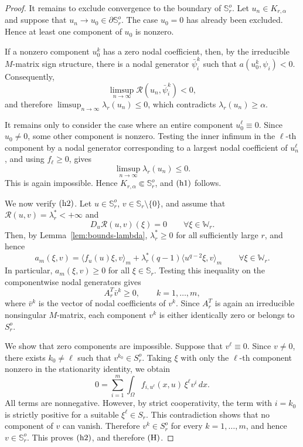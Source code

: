 \documentclass[preprint,10pt]{elsarticle}
\numberwithin{equation}{section}
\begin{document}
\begin{proof}
	It remains to exclude convergence to the boundary of \(\mathbb S_r^o\).
	Let \(u_n\in K_{r,\alpha}\) and suppose that
	\(u_n\to u_0\in\partial\mathbb S_r^o\). The case \(u_0=0\) has already
	been excluded. Hence at least one component of \(u_0\) is nonzero.
	
	If a nonzero component \(u_0^k\) has a zero nodal coefficient, then, by the
	irreducible \(M\)-matrix sign structure, there is a nodal generator
	\(\bar\psi_i^k\) such that \(a(u_0^k,\psi_i)<0\). Consequently,
	\[
	\limsup_{n\to\infty}
	\mathcal R(u_n,\bar\psi_i^k)<0,
	\]
	and therefore \(\limsup_{n\to\infty}\lambda_r(u_n)\le0\), which contradicts
	\(\lambda_r(u_n)\ge\alpha\).
	
	It remains only to consider the case where an entire component
	\(u_0^\ell\equiv0\). Since \(u_0\ne0\), some other component is nonzero.
	Testing the inner infimum in the \(\ell\)-th component by a nodal generator
	corresponding to a largest nodal coefficient of \(u_n^\ell\), and using
	\(f_\ell\ge0\), gives
	\[
	\limsup_{n\to\infty}\lambda_r(u_n)\le0.
	\]
	This is again impossible. Hence \(K_{r,\alpha}\Subset\mathbb S_r^o\), and
	\({\rm (h1)}\) follows.
	
	We now verify \({\rm (h2)}\). Let
	\(u\in\mathbb S_r^o\), \(v\in\mathbb S_r\setminus\{0\}\), and assume that
	\(\mathcal R(u,v)=\lambda_r^*<+\infty\) and
	\[
	D_u\mathcal R(u,v)(\xi)=0
	\qquad \forall \xi\in\mathbb W_r .
	\]
	Then, by Lemma~\ref{lem:bounds-lambda}, \(\lambda_r^*\ge0\) for all
	sufficiently large \(r\), and hence
	\[
	a_m(\xi,v)
	=
	\langle f_u(u)\xi,v\rangle_m
	+
	\lambda_r^*(q-1)\langle u^{q-2}\xi,v\rangle_m
	\qquad \forall \xi\in\mathbb W_r .
	\]
	In particular, \(a_m(\xi,v)\ge0\) for all \(\xi\in\mathbb S_r\). Testing
	this inequality on the componentwise nodal generators gives
	\[
	A_r^T\bar v^k\ge0,
	\qquad k=1,\ldots,m,
	\]
	where \(\bar v^k\) is the vector of nodal coefficients of \(v^k\). Since
	\(A_r^T\) is again an irreducible nonsingular \(M\)-matrix, each component
	\(v^k\) is either identically zero or belongs to \(S_r^o\).
	
	We show that zero components are impossible. Suppose that
	\(v^\ell\equiv0\). Since \(v\ne0\), there exists \(k_0\ne\ell\) such that
	\(v^{k_0}\in S_r^o\). Taking \(\xi\) with only the \(\ell\)-th component
	nonzero in the stationarity identity, we obtain
	\[
	0
	=
	\sum_{i=1}^m
	\int_\Omega f_{i,u^\ell}(x,u)\,\xi^\ell v^i\,dx .
	\]
	All terms are nonnegative. However, by strict cooperativity, the term with
	\(i=k_0\) is strictly positive for a suitable \(\xi^\ell\in S_r\). This
	contradiction shows that no component of \(v\) can vanish. Therefore
	\(v^k\in S_r^o\) for every \(k=1,\ldots,m\), and hence \(v\in\mathbb S_r^o\).
	This proves \({\rm (h2)}\), and therefore \({\rm (H)}\).
\end{proof}
\end{document}
